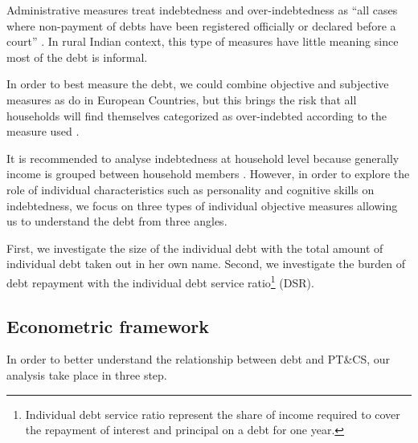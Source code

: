 \documentclass[a4paper, 11pt, onecolumn]{article}
\begin{document}
Administrative measures treat indebtedness and over-indebtedness as ``all cases
where non-payment of debts have been registered officially or declared before a court'' \citep{Betti2007}.
In rural Indian context, this type of measures have little meaning since most of the debt is informal.

In order to best measure the debt, we could combine objective and subjective measures as \cite{Aniola2012} do in European Countries, but this brings the risk that all households will find themselves categorized as over-indebted according to the measure used \citep{Chichaibelu2018}.

It is recommended to analyse indebtedness at household level because generally income is grouped between household members \citep{European2010}.
However, in order to explore the role of individual characteristics such as personality and cognitive skills on indebtedness, we focus on three types of individual objective measures allowing us to understand the debt from three angles.

First, we investigate the size of the individual debt with the total amount of individual debt taken out in her own name.
Second, we investigate the burden of debt repayment with the individual debt service ratio\footnote{Individual debt service ratio represent the share of income required to cover the repayment of interest and principal on a debt for one year.} (DSR).




	\subsection{Econometric framework}
	\label{subsection:econometricframework}

In order to better understand the relationship between debt and PT\&CS, our analysis take place in three step.
\end{document}
